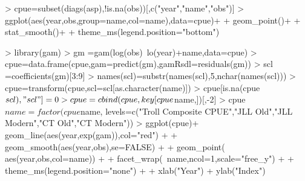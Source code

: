 \documentclass[shortnames,nojss,article]{jss}
\newenvironment{mylisting}
{\begin{list}{}{\setlength{\leftmargin}{1em}}\item\scriptsize\bfseries}
{\end{list}}
\begin{document}
\begin{mylisting}\begin{center}\begin{minipage}[H]{0.95\textwidth}\begin{shaded} 
\begin{Schunk}
\begin{Sinput}
> cpue=subset(diags(asp),!is.na(obs))[,c("year","name","obs")]
> ggplot(aes(year,obs,group=name,col=name),data=cpue)+
+   geom_point()+
+   stat_smooth()+
+   theme_ms(legend.position="bottom")
\end{Sinput}
\end{Schunk}
\end{shaded}\end{minipage}\end{center}\end{mylisting}


\begin{mylisting}\begin{center}\begin{minipage}[H]{0.95\textwidth}\begin{shaded} 
\begin{Schunk}
\begin{Sinput}
> library(gam)
> gm  =gam(log(obs)~lo(year)+name,data=cpue)
> cpue=data.frame(cpue,gam=predict(gm),gamRsdl=residuals(gm))
> scl =coefficients(gm)[3:9]
> names(scl)=substr(names(scl),5,nchar(names(scl)))
> cpue=transform(cpue,scl=scl[as.character(name)])
> cpue[is.na(cpue$scl),"scl"]=0
> cpue=cbind(cpue,key[cpue$name,])[,-2]
> cpue$name=factor(cpue$name, levels=c("Troll Composite CPUE","JLL Old","JLL Modern","CT Old","CT Modern"))
> ggplot(cpue)+ geom_line(aes(year,exp(gam)),col="red")  +
+               geom_smooth(aes(year,obs),se=FALSE)      +           
+               geom_point( aes(year,obs,col=name))       +
+               facet_wrap(~name,ncol=1,scale="free_y")  +
+               theme_ms(legend.position="none")         +
+               xlab("Year") + ylab("Index")
\end{Sinput}
\end{Schunk}
\end{shaded}\end{minipage}\end{center}\end{mylisting}
\end{document}
